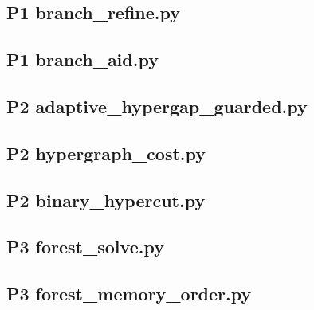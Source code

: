 \documentclass[anonymous,notoc]{gmcm2026}
\begin{document}
\subsection{P1 branch\_refine.py}

\subsection{P1 branch\_aid.py}

\subsection{P2 adaptive\_hypergap\_guarded.py}

\subsection{P2 hypergraph\_cost.py}

\subsection{P2 binary\_hypercut.py}

\subsection{P3 forest\_solve.py}

\subsection{P3 forest\_memory\_order.py}

\end{document}
